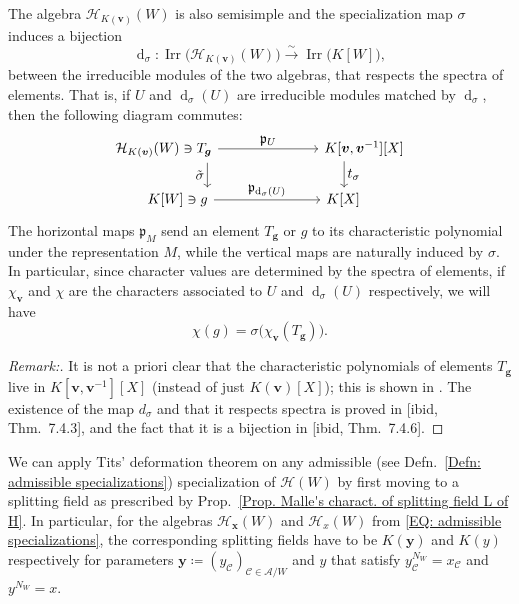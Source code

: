 \documentclass[ALCO, Unicode]{cedram}
\newcommand{\op}[1]{\operatorname{#1}}
\newcommand{\op}[1]{\operatorname{#1}}
\begin{document}
\begin{theo}\label{Thm: Tits deformation theorem}
The algebra $\mathcal{H}_{K(\bm v)}(W)$ is also semisimple and the specialization map $\sigma$ induces a bijection $$ \op{d}_{\sigma}:\op{Irr}\big(\mathcal{H}_{K(\bm v)}(W)\big) \xrightarrow{\displaystyle\sim} \op{Irr}\big(K[W]\big), $$ between the irreducible modules of the two algebras, that respects the spectra of elements. That is, if $U$ and $\op{d}_{\sigma}(U)$ are irreducible modules matched by $\op{d}_{\sigma}$, then the following diagram commutes: 
\begin{equation}%
\begin{tikzcd}
\mathcal{H}_{K(\bm v)}(W)\ni T_{\bm g} \arrow{rrr}{\displaystyle\quad  \mathfrak{p}_U\quad} \arrow[swap,xshift=1.1cm]{d}{\displaystyle \tilde{\sigma}} &&& K[\bm v,\bm v^{-1}][X] \arrow[xshift=-0.5cm]{d}{\displaystyle t_{\sigma}}\\%
\quad \quad K[W]\ni g \arrow{rrr}{\displaystyle \quad \mathfrak{p}_{\op{d}_{\sigma}(U)}\quad  }&&& K[X]\quad \quad \quad 
\end{tikzcd}\label{EQ: spectra are respected by tits def.} 
\end{equation}
The horizontal maps $\mathfrak{p}_M$ send an element $T_{\bm g}$ or $g$ to its characteristic polynomial under the representation $M$, while the vertical maps are naturally induced by $\sigma$. In particular, since character values are determined by the spectra of elements, if $\chi_{\bm v}$ and $\chi$ are the characters associated to $U$ and $\op{d}_{\sigma}(U)$ respectively, we will have \begin{equation}
\chi(g)= \sigma\big(\chi_{\bm v}(T_{\bm g})\big).\label{EQ: characters are respected by tits def.}
\end{equation}
\end{theo}
\begin{proof}[Remark:]
It is not a priori clear that the characteristic polynomials of elements $T_{\bm g}$ live in $K[\bm v,\bm v^{-1}][X]$ (instead of just $K(\bm v)[X]$); this is shown in \cite[Prop.~7.3.8]{geck-pfeiffer-book}. The existence of the map $d_{\sigma}$ and that it respects spectra is proved in [ibid, Thm.~7.4.3], and the fact that it is a bijection in [ibid, Thm.~7.4.6].
\end{proof}

We can apply Tits' deformation theorem on any admissible (see Defn.~\ref{Defn: admissible specializations}) specialization of $\mathcal{H}(W)$ by first moving to a splitting field as prescribed by Prop.~\ref{Prop. Malle's charact. of splitting field L of H}. In particular, for the algebras $\mathcal{H}_{\bm x}(W)$ and $\mathcal{H}_x(W)$ from \eqref{EQ: admissible specializations}, the corresponding splitting fields have to be $K(\bm y)$ and $K(y)$ respectively for parameters $\bm y\coloneqq (y_{\mathcal{C}})_{\mathcal{C}\in\mathcal{A}/W}$ and $y$ that satisfy $y_{\mathcal{C}}^{N_W}=x_\mathcal{C}$ and $y^{N_W}=x$.
\end{document}
